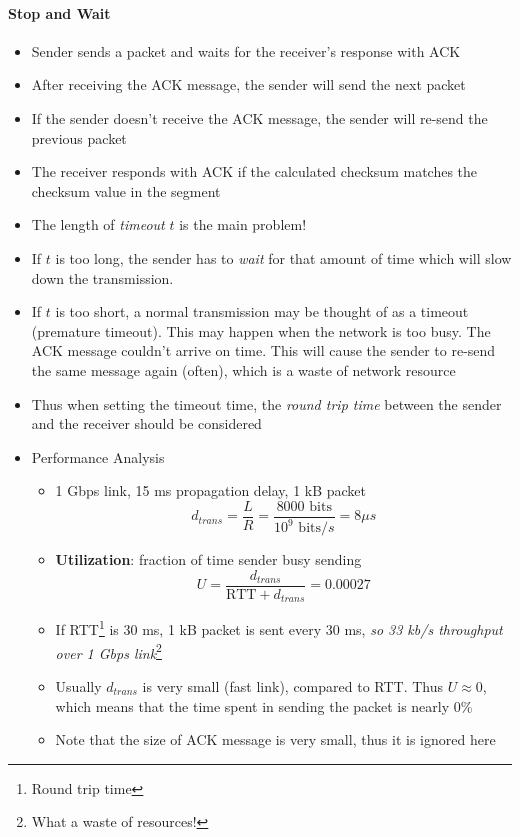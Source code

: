 \paragraph{Stop and Wait}
\begin{itemize}
	\item Sender sends a packet and waits for the receiver's response with ACK
	\item After receiving the ACK message, the sender will send the next packet
	\item If the sender doesn't receive the ACK message, the sender will re-send the previous packet
	\item The receiver responds with ACK if the calculated checksum matches the checksum value in the segment
	\item The length of \textit{timeout} $t$ is the main problem! 
	\item If $t$ is too long, the sender has to \textit{wait} for that amount of time which will slow down the transmission. 
	\item If $t$ is too short, a normal transmission may be thought of as a timeout (premature timeout). This may happen when the network is too busy. The ACK message couldn't arrive on time. This will cause the sender to re-send the same message again (often), which is a waste of network resource
	\item Thus when setting the timeout time, the \textit{round trip time} between the sender and the receiver should be considered
	\item Performance Analysis
	\begin{itemize}
		\item 1 Gbps link, 15 ms propagation delay, 1 kB packet
		$$d_{trans} = \frac{L}{R} = \frac{8000 \text{ bits}}{10^9 \text{ bits/}s} = 8  \mu s $$
		\item \textbf{Utilization}: fraction of time sender busy sending
		$$U = \frac{d_{trans}}{\text{RTT} + d_{trans}} = 0.00027$$
		\item If RTT\footnote{Round trip time} is 30 ms, 1 kB packet is sent every 30 ms, \textit{so 33 kb/s throughput over 1 Gbps link}\footnote{What a waste of resources!}
		\item Usually $d_{trans}$ is very small (fast link), compared to RTT. Thus $U \approx 0$, which means that the time spent in sending the packet is nearly 0\%
		\item Note that the size of ACK message is very small, thus it is ignored here
	\end{itemize}
\end{itemize}

